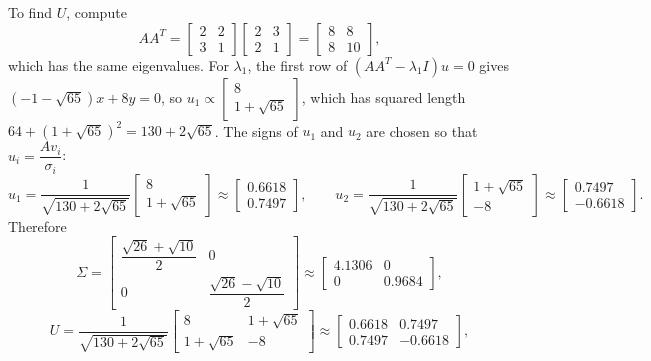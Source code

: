\documentclass[11pt]{article}
\begin{document}
To find $U$, compute
$$
AA^T = \begin{bmatrix} 2 & 2 \\ 3 & 1 \end{bmatrix}
\begin{bmatrix} 2 & 3 \\ 2 & 1 \end{bmatrix}
= \begin{bmatrix} 8 & 8 \\ 8 & 10 \end{bmatrix},
$$
which has the same eigenvalues. For $\lambda_1$, the first row of $(AA^T - \lambda_1 I)u = 0$ gives
$(-1 - \sqrt{65})x + 8y = 0$, so $u_1 \propto \begin{bmatrix} 8 \\ 1 + \sqrt{65} \end{bmatrix}$,
which has squared length $64 + (1 + \sqrt{65})^2 = 130 + 2\sqrt{65}$. The signs of $u_1$ and $u_2$
are chosen so that $u_i = \dfrac{Av_i}{\sigma_i}$:
$$
u_1 = \dfrac{1}{\sqrt{130 + 2\sqrt{65}}}\begin{bmatrix} 8 \\ 1 + \sqrt{65} \end{bmatrix}
\approx \begin{bmatrix} 0.6618 \\ 0.7497 \end{bmatrix}, \qquad
u_2 = \dfrac{1}{\sqrt{130 + 2\sqrt{65}}}\begin{bmatrix} 1 + \sqrt{65} \\ -8 \end{bmatrix}
\approx \begin{bmatrix} 0.7497 \\ -0.6618 \end{bmatrix}.
$$
Therefore
$$
\Sigma = \begin{bmatrix} \dfrac{\sqrt{26} + \sqrt{10}}{2} & 0 \\ 0 & \dfrac{\sqrt{26} - \sqrt{10}}{2} \end{bmatrix}
\approx \begin{bmatrix} 4.1306 & 0 \\ 0 & 0.9684 \end{bmatrix},
$$
$$
U = \dfrac{1}{\sqrt{130 + 2\sqrt{65}}}\begin{bmatrix} 8 & 1 + \sqrt{65} \\ 1 + \sqrt{65} & -8 \end{bmatrix}
\approx \begin{bmatrix} 0.6618 & 0.7497 \\ 0.7497 & -0.6618 \end{bmatrix},
$$
\end{document}
